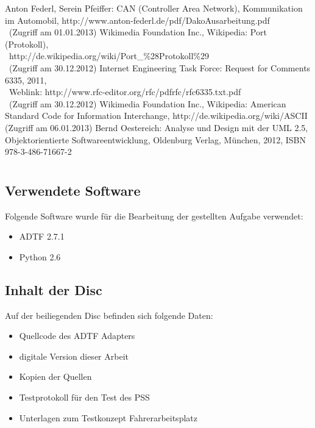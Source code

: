 \documentclass[12pt,a4paper]{report}
\begin{document}
\begin{thebibliography}{99}
Anton Federl, Serein Pfeiffer: CAN (Controller Area Network), Kommunikation im Automobil, http://www.anton-federl.de/pdf/DakoAusarbeitung.pdf
\\\ (Zugriff am 01.01.2013)
Wikimedia Foundation Inc., Wikipedia: Port (Protokoll), 
\\\ http://de.wikipedia.org/wiki/Port\_\%28Protokoll\%29
\\\ (Zugriff am 30.12.2012)
Internet Engineering Task Force: Request for Comments 6335, 2011,
\\\ Weblink: http://www.rfc-editor.org/rfc/pdfrfc/rfc6335.txt.pdf
\\\ (Zugriff am 30.12.2012)
Wikimedia Foundation Inc., Wikipedia: American Standard Code for Information Interchange, http://de.wikipedia.org/wiki/ASCII (Zugriff am 06.01.2013)
Bernd Oestereich: Analyse und Design mit der UML 2.5, Objektorientierte Softwareentwicklung, Oldenburg Verlag, München, 2012, ISBN 978-3-486-71667-2
\end{thebibliography}
\appendix
\chapter[Anhang]{}
\newpage
\section{Verwendete Software}
Folgende Software wurde für die Bearbeitung der gestellten Aufgabe verwendet:
\begin{itemize}
\item{ADTF 2.7.1}
\item{Python 2.6}
\end{itemize}
\section{Inhalt der Disc}
Auf der beiliegenden Disc befinden sich folgende Daten:
\begin{itemize}
\item{Quellcode des ADTF Adapters}
\item{digitale Version dieser Arbeit}
\item{Kopien der Quellen}
\item{Testprotokoll für den Test des PSS}
\item{Unterlagen zum Testkonzept Fahrerarbeitsplatz}
\end{itemize}
\newpage
\end{document}
